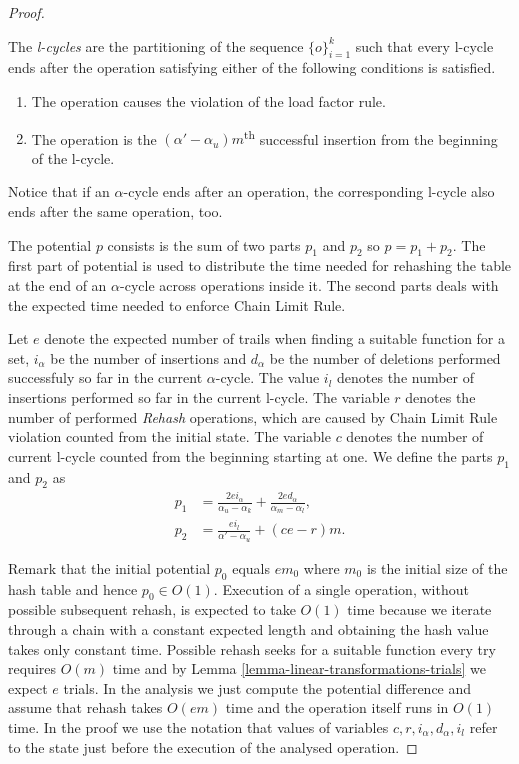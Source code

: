 \begin{proof}
\begin{definition}[l-cycle]
The \emph{l-cycles} are the partitioning of the sequence $\{o\}_{i = 1}^{k}$ such that every l-cycle ends after the operation satisfying either of the following conditions is satisfied.
\begin{enumerate}
\item The operation causes the violation of the load factor rule.
\item The operation is the $(\alpha' - \alpha_u) m$\textsuperscript{th} successful insertion from the beginning of the l-cycle.
\end{enumerate}
\end{definition}
Notice that if an $\alpha$-cycle ends after an operation, the corresponding l-cycle also ends after the same operation, too. 

The potential $p$ consists is the sum of two parts $p_1$ and $p_2$ so $p = p_1 + p_2$. The first part of potential is used to distribute the time needed for rehashing the table at the end of an $\alpha$-cycle across operations inside it. The second parts deals with the expected time needed to enforce Chain Limit Rule.

Let $e$ denote the expected number of trails when finding a suitable function for a set, $i_{\alpha}$ be the number of insertions and $d_{\alpha}$ be the number of deletions performed successfuly so far in the current $\alpha$-cycle. The value $i_l$ denotes the number of insertions performed so far in the current l-cycle. The variable $r$ denotes the number of performed \emph{Rehash} operations, which are caused by Chain Limit Rule violation counted from the initial state. The variable $c$ denotes the number of current l-cycle counted from the beginning starting at one. We define the parts $p_1$ and $p_2$ as
\[
\begin{split}
p_1 & = \frac{2ei_{\alpha}}{\alpha_u - \alpha_k} + \frac{2ed_{\alpha}}{\alpha_m - \alpha_l}, \\
p_2 & = \frac{ei_{l}}{\alpha' - \alpha_u} + (ce - r) m.
\end{split}
\]

Remark that the initial potential $p_0$ equals $em_0$ where $m_0$ is the initial size of the hash table and hence $p_0 \in O(1)$. Execution of a single operation, without possible subsequent rehash, is expected to take $O(1)$ time because we iterate through a chain with a constant expected length and obtaining the hash value takes only constant time. Possible rehash seeks for a suitable function every try requires $O(m)$ time and by Lemma \ref{lemma-linear-transformations-trials} we expect $e$ trials. In the analysis we just compute the potential difference and assume that rehash takes $O(em)$ time and the operation itself runs in $O(1)$ time. In the proof we use the notation that values of variables $c, r, i_\alpha, d_\alpha, i_l$ refer to the state just before the execution of the analysed operation.


\end{proof}
